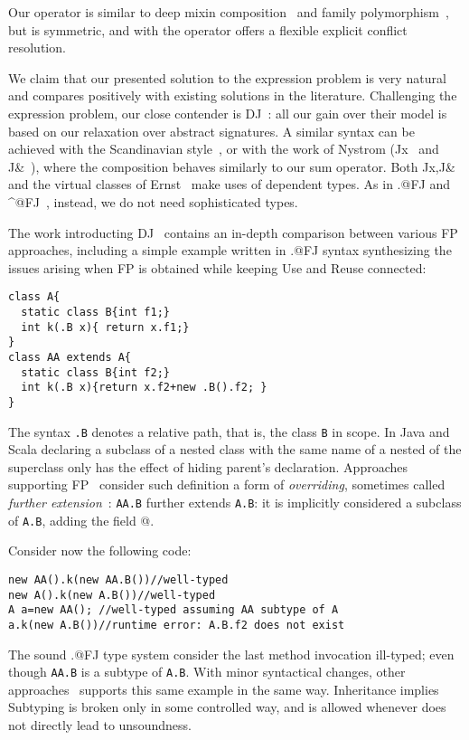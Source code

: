 Our \Q@Use@ operator is similar to deep mixin composition~\cite{Ernst99a,Zenger-Odersky2005, Hutchins06}
and family polymorphism~\cite{Ernst06, igarashi2005lightweight, IgarashiViroli07, IgarashiEtAl08}, but is symmetric, and with the operator
\Q@super@ offers a flexible  explicit conflict resolution.

We claim that our presented solution to the expression problem is very
natural and compares positively with existing solutions in the literature.
Challenging the expression problem, our close contender is DJ~\cite{deep}: all our gain over their model is based on our relaxation over abstract signatures.
A similar syntax can be achieved with the Scandinavian style~\cite{ernst2004expression}, or with the work of 
Nystrom (Jx~\cite{NystromEtAl04} and
J\&~\cite{nystrom2006j}), where the composition behaves similarly to our sum operator.
Both Jx,J\& and the virtual classes of Ernst~\cite{Ernst06}
make uses of dependent types.
As in \Q@.@FJ and \Q@^@FJ~\cite{igarashi2005lightweight,IgarashiEtAl08,IgarashiViroli07},
 instead, we do not need sophisticated types. 

The work introducting DJ~\cite{deep} contains an in-depth comparison between various FP approaches, including a simple example written in \Q@.@FJ syntax synthesizing the issues arising when FP is obtained while keeping Use and Reuse connected:
\begin{lstlisting}
class A{
  static class B{int f1;}  
  int k(.B x){ return x.f1;}
}
class AA extends A{
  static class B{int f2;}
  int k(.B x){return x.f2+new .B().f2; }
}
\end{lstlisting}
The syntax \lstinline{.B} denotes a relative path, that is, the 
class \lstinline{B} in scope.
In Java and Scala declaring a subclass of a nested class with the same
name of a nested of the superclass only has the effect of hiding parent's declaration.
Approaches supporting FP~\cite{igarashi2005lightweight,IgarashiEtAl08,nystrom2006j,Ernst06,BruceEtAl98,IgarashiViroli07,deep}
consider such definition a form of \emph{overriding},
sometimes called \emph{further extension}~\cite{IgarashiViroli07}:
\lstinline{AA.B} further extends \lstinline{A.B}: it is implicitly considered a subclass of \lstinline{A.B}, adding the field @.

Consider now the following code:
\begin{lstlisting}
new AA().k(new AA.B())//well-typed
new A().k(new A.B())//well-typed
A a=new AA(); //well-typed assuming AA subtype of A
a.k(new A.B())//runtime error: A.B.f2 does not exist
\end{lstlisting}
The sound \Q@.@FJ type system consider the last method invocation ill-typed; even though \lstinline{AA.B} is a subtype of \lstinline{A.B}.
With minor syntactical changes, other approaches~\cite{nystrom2006j,Ernst06,BruceEtAl98,IgarashiViroli07}
supports this same example in the same way.
Inheritance implies Subtyping is broken only in some controlled way, and is  allowed whenever does not directly lead to unsoundness.

